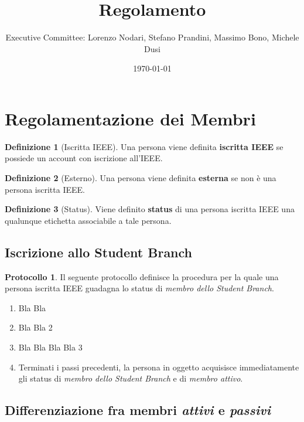 \documentclass[pdf]{article}
\title{Regolamento}
\author{Executive Committee: Lorenzo Nodari, Stefano Prandini, Massimo Bono, Michele Dusi}
\date{\today}
\theoremstyle{definition}
\newtheorem{defn}{Definizione}[section]
\newtheorem{prot}{Protocollo}[subsection]
\renewcommand{\i}[1]{\textit{#1}}
\renewcommand{\b}[1]{\textbf{#1}}
\begin{document}
\maketitle

\newpage

\section{Regolamentazione dei Membri}

\begin{defn}[Iscritta IEEE]
	Una persona viene definita \b{iscritta IEEE} se possiede un account con iscrizione all'IEEE.
\end{defn}

\begin{defn}[Esterno]
	Una persona viene definita \b{esterna} se non è una persona iscritta IEEE.
\end{defn}

\begin{defn}[Status]
	Viene definito \b{status} di una persona iscritta IEEE una qualunque etichetta associabile a tale persona.
\end{defn}

\subsection{Iscrizione allo Student Branch}

\begin{prot}
	\label{Iscrizione allo Student Branch IEEE}
	Il seguente protocollo definisce la procedura per la quale una persona iscritta IEEE guadagna lo status di \i{membro dello Student Branch}.
	\begin{enumerate}
		\item Bla Bla
		\item Bla Bla 2
		\item Bla Bla Bla Bla 3
		\item Terminati i passi precedenti, la persona in oggetto acquisisce immediatamente gli status di \i{membro dello Student Branch} e di \i{membro attivo}.
	\end{enumerate}
\end{prot}

\subsection{Differenziazione fra membri \i{attivi} e \i{passivi}}

\end{document}
